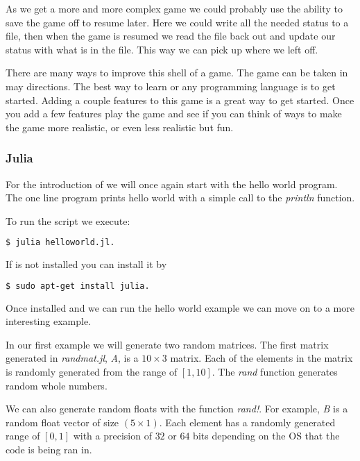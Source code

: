 As we get a more and more complex game we could probably use the ability to save the game off to resume later. Here we could write all the needed status to a file, then when the game is resumed we read the file back out and update our status with what is in the file. This way we can pick up where we left off. 

There are many ways to improve this shell of a game. The game can be taken in may directions. The best way to learn  or any programming language is to get started. Adding a couple features to this game is a great way to get started. Once you add a few features play the game and see if you can think of ways to make the game more realistic, or even less realistic but fun.

\subsubsection{Julia}

For the introduction of \emph{} we will once again start with the hello world program. The one line program prints hello world with a simple call to the \emph{println} function. 
	
	

To run the  script we execute:

\begin{lstlisting}[language=bash]
    $ julia helloworld.jl.
\end{lstlisting}

If \emph{} is not installed you can install it by \cite{juliaref}

\begin{lstlisting}[language=bash]
    $ sudo apt-get install julia.
\end{lstlisting}

Once installed and we can run the hello world example we can move on to a more interesting example. 

In our first example we will generate two random matrices. The first matrix generated in \emph{randmat.jl}, \emph{A}, is a $10\times3$ matrix. Each of the elements in the matrix is randomly generated from the range of $[1, 10]$. The \emph{rand} function generates random whole numbers. 

We can also generate random floats with the function \emph{rand!}. For example, \emph{B} is a random float vector of size $(5\times1)$. Each element has a randomly generated range of $[0,1]$ with a precision of $32$ or $64$ bits depending on the \ac{OS} that the code is being ran in. 

